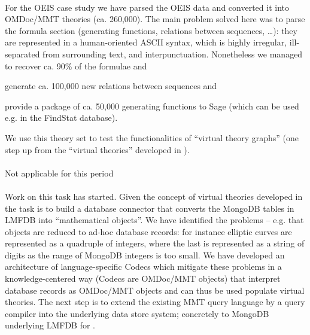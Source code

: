 \documentclass{deliverablereport}
\begin{document}
  \paragraph{}
  For the OEIS case study we have parsed the OEIS data and converted it into OMDoc/MMT
  theories (ca. 260,000). The main problem solved here was to parse the formula section
  (generating functions, relations between sequences, \ldots): they are represented in a
  human-oriented ASCII syntax, which is highly irregular, ill-separated from surrounding
  text, and interpunctuation. Nonetheless we managed to recover ca. 90\% of the formulae
  and 
  \begin{compactenum}[\em i\rm)]
  \item generate ca. 100,000 new relations between sequences and 
  \item provide a package of ca. 50,000 generating functions to Sage (which can be used
    e.g. in the FindStat database). 
  \end{compactenum}
  We use this theory set to test the functionalities of ``virtual theory graphs'' (one
  step up from the ``virtual theories'' developed in ).

  \paragraph{}
  Not applicable for this period

  \paragraph{}
  Work on this task has started. Given the concept of virtual theories developed in
   the task is to build a database connector that converts
  the MongoDB tables in LMFDB into ``mathematical objects''.  We have identified the
  problems -- e.g. that objects are reduced to ad-hoc database records: for instance
  elliptic curves are represented as a quadruple of integers, where the last is
  represented as a string of digits as the range of MongoDB integers is too small. We have
  developed an architecture of language-specific Codecs which mitigate these problems in a
  knowledge-centered way (Codecs are OMDoc/MMT objects) that interpret database records as
  OMDoc/MMT objects and can thus be used populate virtual theories.  The next step is to
  extend the existing MMT query language by a query compiler into the underlying data
  store system; concretely to MongoDB underlying LMFDB for .
\end{document}
